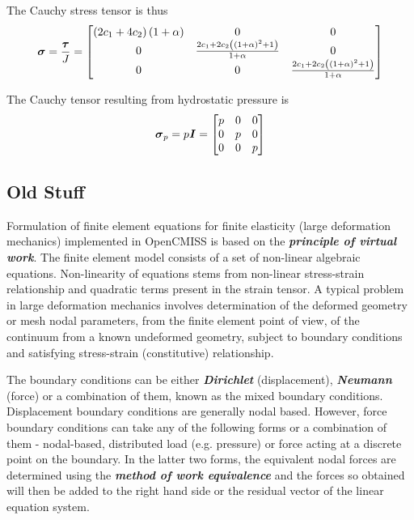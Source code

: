 The Cauchy stress tensor is thus
\begin{equation}
  \boldsymbol{\mathit{\sigma}} = \frac{\boldsymbol{\mathit{\tau}}}{J}= \begin{bmatrix}
    \left( 2c_{1}+4c_{2} \right)\left( 1+\alpha \right) & 0 & 0 \\
    0 & \frac{2c_{1}+2c_{2}\left( \left( 1+\alpha \right)^2+1 \right)}{1+\alpha} & 0 \\
    0 & 0 & \frac{2c_{1}+2c_{2}\left( \left( 1+\alpha \right)^2+1 \right)}{1+\alpha}
  \end{bmatrix}
\end{equation}

The Cauchy tensor resulting from hydrostatic pressure is 
\begin{equation}
  \boldsymbol{\mathit{\sigma}}_{p}= p\boldsymbol{\mathit{I}}=\begin{bmatrix}
    p & 0 & 0 \\
    0 & p & 0 \\
    0 & 0 & p
  \end{bmatrix}
\end{equation}

\subsection{Old Stuff}

Formulation of finite element equations for finite elasticity (large
deformation mechanics) implemented in OpenCMISS is based on the
\textit{\textbf{principle of virtual work}}. The finite element model consists
of a set of non-linear algebraic equations. Non-linearity of equations stems
from non-linear stress-strain relationship and quadratic terms present in the
strain tensor. A typical problem in large deformation mechanics involves
determination of the deformed geometry or mesh nodal parameters, from the
finite element point of view, of the continuum from a known undeformed
geometry, subject to boundary conditions and satisfying stress-strain
(constitutive) relationship.
  
The boundary conditions can be either \textit{\textbf{Dirichlet}}
(displacement), \textit{\textbf{Neumann}} (force) or a combination of them,
known as the mixed boundary conditions. Displacement boundary conditions are
generally nodal based. However, force boundary conditions can take any of the
following forms or a combination of them - nodal-based, distributed load
(e.g. pressure) or force acting at a discrete point on the boundary. In the
latter two forms, the equivalent nodal forces are determined using the
\textit{\textbf{method of work equivalence}} \cite{hutton:2004} and the forces
so obtained will then be added to the right hand side or the residual vector
of the linear equation system.

